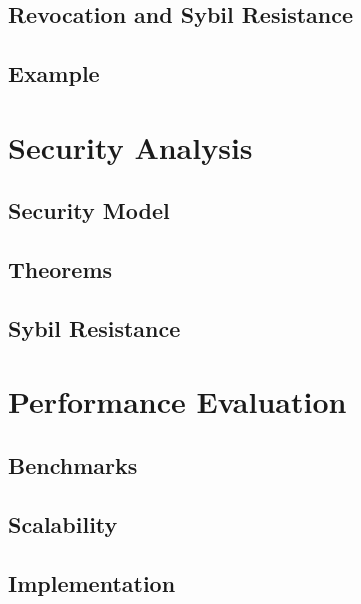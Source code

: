 \subsection{Revocation and Sybil Resistance}

\subsection{Example}

\section{Security Analysis}
\subsection{Security Model}

\subsection{Theorems}

\subsection{Sybil Resistance}

\section{Performance Evaluation}
\subsection{Benchmarks}

\subsection{Scalability}

\subsection{Implementation}





























